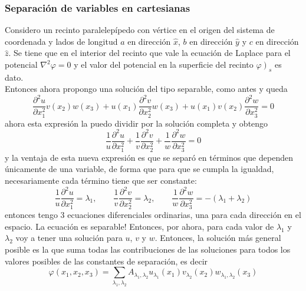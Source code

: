 \subsubsection{Separación de variables en cartesianas}
Considero un recinto paralelepípedo con vértice en el origen del sistema de coordenada y lados de longitud $a$ en dirección $\hat{x}$, $b$ en dirección $\hat{y}$ y $c$ en dirección $\hat{z}$. Se tiene que en el interior del recinto que vale la ecuación de Laplace para el potencial $\nabla^{2} \varphi = 0$ y el valor del potencial en la superficie del recinto $\left.\varphi\right)_{s}$ es dato.\\
\indent Entonces ahora propongo una solución del tipo separable, como antes y queda
\begin{equation*}
    \frac{\partial^{2} u}{\partial x_{1}^{2}}v(x_{2})w(x_{3})
    +
    u(x_{1})\frac{\partial^{2} v}{\partial x_{2}^{2}}w(x_{3})
    +
    u(x_{1})v(x_{2})\frac{\partial^{2} w}{\partial x_{3}^{2}}
    = 0
\end{equation*}
ahora esta expresión la puedo dividir por la solución completa y obtengo
\begin{equation*}
    \frac{1}{u}\frac{\partial^{2}u}{\partial x_{1}^{2}}
    +
    \frac{1}{v}\frac{\partial^{2}v}{\partial x_{2}^{2}}
    +
    \frac{1}{w}\frac{\partial^{2}w}{\partial x_{3}^{2}}
    = 0
\end{equation*}
y la ventaja de esta nueva expresión es que se separó en términos que dependen únicamente de una variable, de forma que para que se cumpla la igualdad, necesariamente cada término tiene que ser constante:
\begin{equation*}
    \frac{1}{u}\frac{\partial^{2}u}{\partial x_{1}^{2}} = \lambda_{1},
    \quad
    \quad
    \frac{1}{v}\frac{\partial^{2}v}{\partial x_{2}^{2}} =
    \lambda_{2},
    \quad
    \quad
    \frac{1}{w}\frac{\partial^{2}w}{\partial x_{3}^{2}} = 
    -(\lambda_{1} + \lambda_{2})
\end{equation*}
entonces tengo 3 ecuaciones diferenciales ordinarias, una para cada dirección en el espacio. La ecuación es separable! Entonces, por ahora, para cada valor de $\lambda_{1}$ y $\lambda_{2}$ voy a tener una solución para $u$, $v$ y $w$. Entonces, la solución más general posible es la que suma todas las contribuciones de las soluciones para todos los valores posibles de las constantes de separación, es decir
\begin{equation*}
    \varphi(x_{1},x_{2},x_{3}) = 
    \sum\limits_{\lambda_{1},\lambda_{2}}
    A_{\lambda_{1},\lambda_{2}}
    u_{\lambda_{1}}(x_{1})
    v_{\lambda_{2}}(x_{2})
    w_{\lambda_{1},\lambda_{2}}(x_{3})
\end{equation*}
